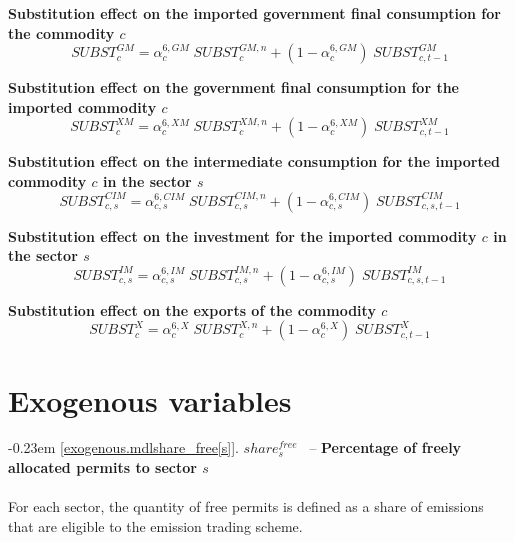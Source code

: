 \documentclass[12pt]{article}
\numberwithin{equation}{section}
\begin{document}
\noindent \textbf{Substitution effect on the imported government final consumption for the commodity $c$} 
\begin{dmath}
SUBST^{GM}_{c} = \alpha^{{6},GM}_{c} \; SUBST^{GM,n}_{c} + \left( 1 - \alpha^{{6},GM}_{c} \right) \; SUBST^{GM}_{c, t-1}
\label{adjustments.mdlSUBST_GM[c]}
\end{dmath}

\noindent \textbf{Substitution effect on the government final consumption for the imported commodity $c$} 
\begin{dmath}
SUBST^{XM}_{c} = \alpha^{{6},XM}_{c} \; SUBST^{XM,n}_{c} + \left( 1 - \alpha^{{6},XM}_{c} \right) \; SUBST^{XM}_{c, t-1}
\label{adjustments.mdlSUBST_XM[c]}
\end{dmath}

\noindent \textbf{Substitution effect on the intermediate consumption for the imported commodity $c$ in the sector $s$} 
\begin{dmath}
SUBST^{CIM}_{c, s} = \alpha^{{6},CIM}_{c, s} \; SUBST^{CIM,n}_{c, s} + \left( 1 - \alpha^{{6},CIM}_{c, s} \right) \; SUBST^{CIM}_{c, s, t-1}
\label{adjustments.mdlSUBST_CIM[c, s]}
\end{dmath}

\noindent \textbf{Substitution effect on the investment for the imported commodity $c$ in the sector $s$} 
\begin{dmath}
SUBST^{IM}_{c, s} = \alpha^{{6},IM}_{c, s} \; SUBST^{IM,n}_{c, s} + \left( 1 - \alpha^{{6},IM}_{c, s} \right) \; SUBST^{IM}_{c, s, t-1}
\label{adjustments.mdlSUBST_IM[c, s]}
\end{dmath}

\noindent \textbf{Substitution effect on the exports of the commodity $c$} 
\begin{dmath}
SUBST^{X}_{c} = \alpha^{{6},X}_{c} \; SUBST^{X,n}_{c} + \left( 1 - \alpha^{{6},X}_{c} \right) \; SUBST^{X}_{c, t-1}
\label{adjustments.mdlSUBST_X[c]}
\end{dmath}\newpage\section{Exogenous variables}



\noindent \kern-0.23em \noindent \begingroup {} \label{exogenous.mdlshare_free[s]}\ref{exogenous.mdlshare_free[s]}.
         
        \ensuremath{share^{free}_{s}}~ \endgroup -- \noindent \textbf{Percentage of freely allocated permits to sector $s$}  \\ \\[-8pt]For each sector, the quantity of free permits is defined as a share of emissions that are eligible to the emission trading scheme. \\
\end{document}
